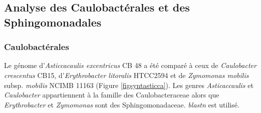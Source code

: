 \subsection{Analyse des Caulobactérales et des Sphingomonadales}
\subsubsection{Caulobactérales}\label{parasti}
   Le génome d'\textit{Asticcacaulis excentricus} CB 48 a été comparé à ceux de \textit{Caulobacter crescentus} CB15, d'\textit{Erythrobacter litoralis} HTCC2594 et de \textit{Zymomonas mobilis} subsp. \textit{mobilis} NCIMB 11163 (Figure \ref{figsyntasticca}). Les genres \textit{Asticaccaulis} et \textit{Caulobacter} appartiennent à la famille des Caulobacteraceae alors que \textit{Erythrobacter} et \textit{Zymomonas} sont des Sphingomonadaceae.  \textit{blastn} est utilisé. 

